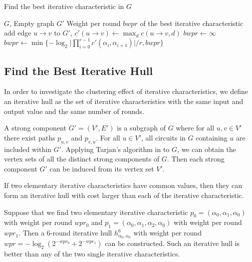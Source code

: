 \begin{algorithm}
	\caption{Find the best iterative characteristic in $G$}
	\label{algo:find_ite_c_G}
	\begin{algorithmic}[1]
        \Require $G$, Empty graph $G'$
        \Ensure Weight per round $bwpr$ of the best iterative characteristic
        \Procedure {}{}
        \State add edge $u\rightarrow v$ to $G'$, $c'(u\rightarrow v)\leftarrow \max_d c(u\rightarrow v,d)$
        \EndFor
        \State $bwpr\leftarrow\infty$
        \State $bwpr\leftarrow\min\{-\log_2\Big|\prod\limits_{i=0}^{r-1}c'(\alpha_i,\alpha_{i+1})\Big|/r,bwpr\}$        
        \EndFor
		\EndProcedure
	\end{algorithmic}
\end{algorithm}

\subsection{Find the Best Iterative Hull}\label{sec:find_ite_h}

In order to investigate the clustering effect of iterative characteristics, we define an iterative hull as the set of iterative characteristics with the same input and output value and the same number of rounds. 

A strong component $G'=(V',E')$ is a subgraph of $G$ where for all $u,v\in V'$ there exist paths $p_{u,v}$ and $p_{v,u}$. For all $u\in V'$, all circuits in $G$ containing $u$ are included within $G'$. Applying Tarjan's algorithm in \cite{tarjan1972depth} to $G$, we can obtain the vertex sets of all the distinct strong components of $G$. Then each strong component $G'$ can be induced from its vertex set $V'$. 

If two elementary iterative characteristics have common values, then they can form an iterative hull with cost larger than each of the iterative characteristic. 
\begin{example}\label{exp:ih}
    Suppose that we find two elementary iterative characteristic $p_0=(\alpha_0,\alpha_1,\alpha_0)$ with weight per round $wpr_0$ and $p_1=(\alpha_0,\alpha_1,\alpha_2,\alpha_0)$ with weight per round $wpr_1$. Then a 6-round iterative hull $h_{\alpha_0,\alpha_0}^6$ with weight per round $wpr=-\log_2(2^{-wpr_0}+2^{-wpr_1})$ can be constructed. Such an iterative hull is better than any of the two single iterative characteristics.
\end{example}

